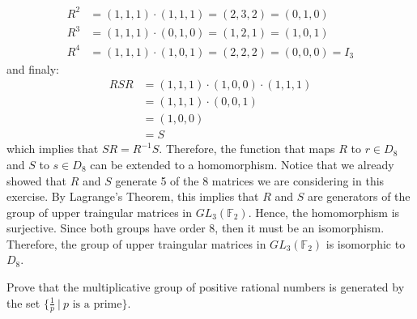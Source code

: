 \begin{solution}
\begin{align*}
        R^2 &= (1,1,1)\cdot (1,1,1) = (2,3,2) = (0,1,0) \\
        R^3 &= (1,1,1)\cdot (0,1,0) = (1,2,1) = (1,0,1) \\
        R^4 &= (1,1,1)\cdot (1,0,1) = (2,2,2) = (0,0,0) = I_3
    \end{align*}
    and finaly:
    \begin{align*}
        RSR &= (1,1,1)\cdot (1,0,0) \cdot (1,1,1) \\
        &= (1,1,1)\cdot (0,0,1) \\
        &= (1,0,0) \\
        &= S
    \end{align*}
    which implies that $SR = R^{-1}S$. Therefore, the function that maps $R$ to $r \in D_8$ and $S$ to $s \in D_8$ can be extended to a homomorphism. Notice that we already showed that $R$ and $S$ generate 5 of the 8 matrices we are considering in this exercise. By Lagrange's Theorem, this implies that $R$ and $S$ are generators of the group of upper traingular matrices in $GL_3(\mathbb{F}_2)$. Hence, the homomorphism is surjective. Since both groups have order 8, then it must be an isomorphism. Therefore, the group of upper traingular matrices in $GL_3(\mathbb{F}_2)$ is isomorphic to $D_8$. \\
\end{solution}

\begin{exercise}
    Prove that the multiplicative group of positive rational numbers is generated by the set $\{\frac{1}{p} \ | \ p \text{ is a prime}\}$. \\
\end{exercise}

